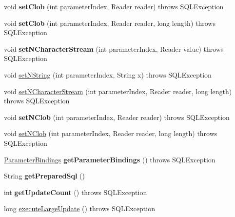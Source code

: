 \begin{DoxyCompactItemize}
void {\bfseries set\+Clob} (int parameter\+Index, Reader reader)  throws S\+Q\+L\+Exception 
\item 
\mbox{\label{classcom_1_1mysql_1_1jdbc_1_1_prepared_statement_a28b8277d0dcd7f5184ce11b0cfb9fb9a}} 
void {\bfseries set\+Clob} (int parameter\+Index, Reader reader, long length)  throws S\+Q\+L\+Exception 
\item 
\mbox{\label{classcom_1_1mysql_1_1jdbc_1_1_prepared_statement_a432ca600d8f804c01d52416457e69d48}} 
void {\bfseries set\+N\+Character\+Stream} (int parameter\+Index, Reader value)  throws S\+Q\+L\+Exception 
\item 
void \mbox{\hyperlink{classcom_1_1mysql_1_1jdbc_1_1_prepared_statement_a8a013584b26bbffe4b3c11c283ef6efc}{set\+N\+String}} (int parameter\+Index, String x)  throws S\+Q\+L\+Exception 
\item 
void \mbox{\hyperlink{classcom_1_1mysql_1_1jdbc_1_1_prepared_statement_af1b2dd7f3f872f4ff1400be1d760e200}{set\+N\+Character\+Stream}} (int parameter\+Index, Reader reader, long length)  throws S\+Q\+L\+Exception 
\item 
\mbox{\label{classcom_1_1mysql_1_1jdbc_1_1_prepared_statement_a677fc55abb97ff80b34fe943063a6b60}} 
void {\bfseries set\+N\+Clob} (int parameter\+Index, Reader reader)  throws S\+Q\+L\+Exception 
\item 
void \mbox{\hyperlink{classcom_1_1mysql_1_1jdbc_1_1_prepared_statement_aacd4ab63c372045d3e340bccf996e227}{set\+N\+Clob}} (int parameter\+Index, Reader reader, long length)  throws S\+Q\+L\+Exception 
\item 
\mbox{\label{classcom_1_1mysql_1_1jdbc_1_1_prepared_statement_afd34466552f4cd98e571a65a33038916}} 
\mbox{\hyperlink{interfacecom_1_1mysql_1_1jdbc_1_1_parameter_bindings}{Parameter\+Bindings}} {\bfseries get\+Parameter\+Bindings} ()  throws S\+Q\+L\+Exception 
\item 
\mbox{\label{classcom_1_1mysql_1_1jdbc_1_1_prepared_statement_ac32663dd7cd29fc79a323db94f03694e}} 
String {\bfseries get\+Prepared\+Sql} ()
\item 
\mbox{\label{classcom_1_1mysql_1_1jdbc_1_1_prepared_statement_a4922b9bd45e7dc06a43917c08b6efebb}} 
int {\bfseries get\+Update\+Count} ()  throws S\+Q\+L\+Exception 
\item 
long \mbox{\hyperlink{classcom_1_1mysql_1_1jdbc_1_1_prepared_statement_a9db54f06b57ab9446798d306d59aeefc}{execute\+Large\+Update}} ()  throws S\+Q\+L\+Exception 
\end{DoxyCompactItemize}
